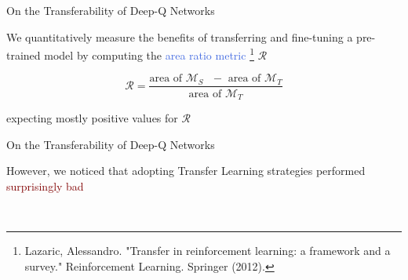 \documentclass{beamer}
\begin{document}
\begin{frame}{On the Transferability of Deep-Q Networks}

	We quantitatively measure the benefits of transferring and fine-tuning a pre-trained model by computing the \textcolor{RoyalBlue}{area ratio metric} \footnote{Lazaric, Alessandro. "Transfer in reinforcement learning: a framework and a survey." Reinforcement Learning. Springer (2012).} $\mathscr{R}$

	\begin{equation*}
		\mathscr{R} = \frac{\text{area of $\mathcal{M}_S$ $-$ area of $\mathcal{M}_T$}}{\text{area of $\mathcal{M}_T$}}
	\label{eq:area_ratio_metric}
	\end{equation*}

	\bigskip
	expecting mostly positive values for $\mathscr{R}$

\end{frame}

\begin{frame}{On the Transferability of Deep-Q Networks}

	\bigskip

	However, we noticed that adopting Transfer Learning strategies performed \textcolor{Maroon}{surprisingly bad}

	\begin{table}[t!]
	{}
	\label{tab:dqv_res}


        ~\\
	{}
	\label{tab:ddqn_res}
\end{table}

\end{frame}
\end{document}
